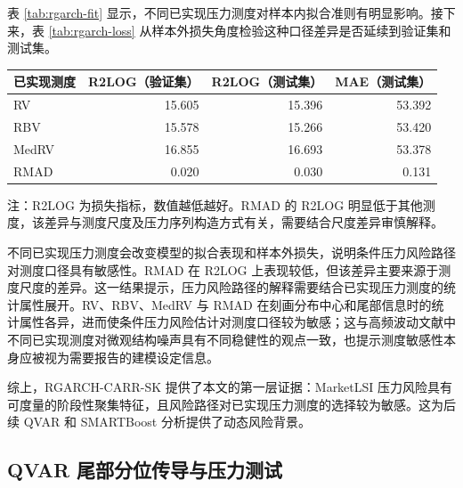 \documentclass[12pt,a4paper]{ctexart}
\begin{document}
表 \ref{tab:rgarch-fit} 显示，不同已实现压力测度对样本内拟合准则有明显影响。接下来，表 \ref{tab:rgarch-loss} 从样本外损失角度检验这种口径差异是否延续到验证集和测试集。

\begin{center}
\begingroup
\captionsetup{type=table}
\begin{minipage}{\textwidth}
\centering
{}
\label{tab:rgarch-loss}
\small
\begin{threeparttable}
\begin{tabular}{lrrr}
\toprule
已实现测度 & R2LOG（验证集） & R2LOG（测试集） & MAE（测试集） \\
\midrule
RV & 15.605 & 15.396 & 53.392 \\
RBV & 15.578 & 15.266 & 53.420 \\
MedRV & 16.855 & 16.693 & 53.378 \\
RMAD & 0.020 & 0.030 & 0.131 \\
\bottomrule
\end{tabular}
\begin{tablenotes}[flushleft]
\footnotesize
\item 注：R2LOG 为损失指标，数值越低越好。RMAD 的 R2LOG 明显低于其他测度，该差异与测度尺度及压力序列构造方式有关，需要结合尺度差异审慎解释。
\end{tablenotes}
\end{threeparttable}
\end{minipage}
\endgroup
\end{center}

不同已实现压力测度会改变模型的拟合表现和样本外损失，说明条件压力风险路径对测度口径具有敏感性。RMAD 在 R2LOG 上表现较低，但该差异主要来源于测度尺度的差异。这一结果提示，压力风险路径的解释需要结合已实现压力测度的统计属性展开。RV、RBV、MedRV 与 RMAD 在刻画分布中心和尾部信息时的统计属性各异，进而使条件压力风险估计对测度口径较为敏感；这与高频波动文献中不同已实现测度对微观结构噪声具有不同稳健性的观点一致，也提示测度敏感性本身应被视为需要报告的建模设定信息。

综上，RGARCH-CARR-SK 提供了本文的第一层证据：MarketLSI 压力风险具有可度量的阶段性聚集特征，且风险路径对已实现压力测度的选择较为敏感。这为后续 QVAR 和 SMARTBoost 分析提供了动态风险背景。


\subsection{QVAR 尾部分位传导与压力测试}
\label{subsec:qvar-results}
\end{document}
